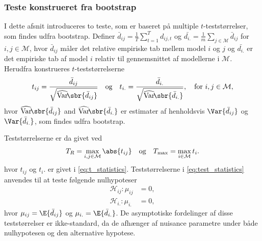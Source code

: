 \subsubsection{Teste konstrueret fra bootstrap}
I dette afsnit introduceres to teste, som er baseret på multiple \(t\)-teststørrelser, som findes udfra bootstrap.
Definer \(\bar{d}_{ij} = \frac{1}{T} \sum_{t = 1}^T d_{ij,t}\) og \(\bar{d_{i.}} = \frac{1}{m} \sum_{j \in \mathcal{M}} \bar{d}_{ij}\) for \(i,j \in \mathcal{M}\), hvor \(\bar{d}_{ij}\) måler det relative empiriske tab mellem model \(i\) og \(j\) og \(\bar{d_{i.}}\) er det empiriske tab af model \(i\) relativ til gennemsnittet af modellerne i \(\mathcal{M}\). 
Herudfra konstrueres \(t\)-teststørrelserne
\begin{align}
t_{ij} = \frac{\bar{d}_{ij}}{\sqrt{\widehat{\mathrm{Var}}\!\sbr{\bar{d}_{ij}}}} \quad \text{og} \quad t_{i.} = \frac{\bar{d}_{i.}}{\sqrt{\widehat{\mathrm{Var}}\!\sbr{\bar{d}_{i.}}}}, \quad \text{for } i,j \in \mathcal{M}, \label{eq:t_statistics}
\end{align}
hvor \(\widehat{\mathrm{Var}}\!\sbr{\bar{d}_{ij}}\) and \(\widehat{\mathrm{Var}}\!\sbr{\bar{d}_{i.}}\) er estimater af henholdsvis \(\Var{\bar{d}_{ij}}\) og \(\Var{\bar{d}_{i.}}\), som findes udfra bootstrap.

Teststørrelserne er da givet ved
\begin{align} 
T_R = \max_{i,j \in \mathcal{M}} \abs{t_{ij}} \quad \text{og} \quad T_{\text{max}} = \max_{i \in \mathcal{M}} t_i. \label{eq:test_statistics}
\end{align}
hvor \(t_{ij}\) og \(t_i.\) er givet i \eqref{eq:t_statistics}.
Teststørrelserne i \eqref{eq:test_statistics} anvendes til at teste følgende nulhypoteser
\begin{align*}
\mathcal{H}_{ij}:\mu_{ij}&=0, \\
\mathcal{H}_{i.} : \mu_{i.}&=0,
\end{align*}
hvor \(\mu_{ij} = \E{\bar{d}_{ij}}\) og \(\mu_{i.} = \E{\bar{d}_{i.}}\).
De asymptotiske fordelinger af disse teststørrelser er ikke-standard, da de afhænger af nuisance parametre under både nulhypotesen og den alternative hypotese.
